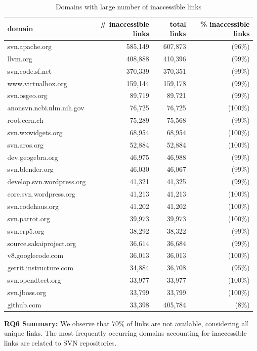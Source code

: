 \documentclass[smallextended]{svjour3}       %
\newcommand{\minor}[1]{\textcolor{black}{#1}}
\begin{document}

\begin{table}[t]
\centering
\caption{Domains with large number of \minor{inaccessible} links}
\label{tab:deadlinks}
\begin{tabular}{lrrr}
\toprule
\textbf{domain} & \textbf{\# \minor{inaccessible} links} & \textbf{total links} & \textbf{\% \minor{inaccessible} links} \\
\midrule
svn.apache.org & 585,149 & 607,873 & (96\%) \\
llvm.org & 408,888 & 410,396 & (99\%) \\
svn.code.sf.net & 370,339 & 370,351 & (99\%) \\
www.virtualbox.org & 159,144 & 159,178 & (99\%) \\
svn.osgeo.org & 89,719 & 89,721 & (99\%) \\
anonsvn.ncbi.nlm.nih.gov & 76,725 & 76,725 & (100\%) \\
root.cern.ch & 75,289 & 75,568 & (99\%) \\
svn.wxwidgets.org & 68,954 & 68,954 & (100\%) \\
svn.aros.org & 52,884 & 52,884 & (100\%) \\
dev.geogebra.org & 46,975 & 46,988 & (99\%) \\
svn.blender.org & 46,030 & 46,067 & (99\%) \\
develop.svn.wordpress.org & 41,321 & 41,325 & (99\%) \\
core.svn.wordpress.org & 41,213 & 41,213 & (100\%) \\
svn.codehaus.org & 41,202 & 41,202 & (100\%) \\
svn.parrot.org & 39,973 & 39,973 & (100\%) \\
svn.erp5.org & 38,292 & 38,322 & (99\%) \\
source.sakaiproject.org & 36,614 & 36,684 & (99\%) \\
v8.googlecode.com & 36,013 & 36,013 & (100\%) \\
gerrit.instructure.com & 34,884 & 36,708 & (95\%) \\
svn.opendtect.org & 33,977 & 33,977 & (100\%) \\
svn.jboss.org & 33,799 & 33,799 & (100\%) \\
github.com & 33,398 & 405,784 & (8\%) \\
\bottomrule
\end{tabular}
\end{table}


\begin{tcolorbox}
\textbf{RQ6 Summary:}
We observe that 70\% of links are not available, considering all unique links. The most frequently occurring domains accounting for \minor{inaccessible} links are related to SVN repositories.
\end{tcolorbox}
\end{document}
